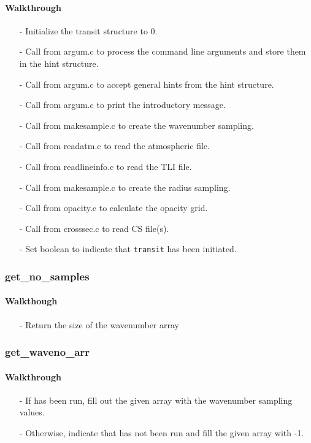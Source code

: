 \documentclass[letterpaper,12pt]{article}
\begin{document}
\paragraph{Walkthrough}
\begin{enumerate}[leftmargin=10pt, noitemsep, parsep=0pt, topsep=0ex]
\item[-] Initialize the transit structure to 0.
\item[-] Call  from argum.c to process the command line arguments and store them in the hint structure.
\item[-] Call  from argum.c to accept general hints from the hint structure.
\item[-] Call  from argum.c to print the introductory message.
\item[-] Call  from makesample.c to create the wavenumber sampling.
\item[-] Call  from readatm.c to read the atmospheric file.
\item[-] Call  from readlineinfo.c to read the TLI file.
\item[-] Call  from makesample.c to create the radius sampling.
\item[-] Call  from opacity.c to calculate the opacity grid.
\item[-] Call  from crosssec.c to read CS file(s).
\item[-] Set boolean to indicate that {\tt transit} has been initiated.
\end{enumerate}

\subsubsection{get\_no\_samples}
\paragraph{Walkthough}
\begin{enumerate}[leftmargin=10pt, noitemsep, parsep=0pt, topsep=0ex]
\item[-] Return the size of the wavenumber array
\end{enumerate}

\subsubsection{get\_waveno\_arr}
\paragraph{Walkthrough}
\begin{enumerate}[leftmargin=10pt, noitemsep, parsep=0pt, topsep=0ex]
\item[-] If  has been run, fill out the given array with the wavenumber sampling values.
\item[-] Otherwise, indicate that  has not been run and fill the given array with -1.
\end{enumerate}
\end{document}
